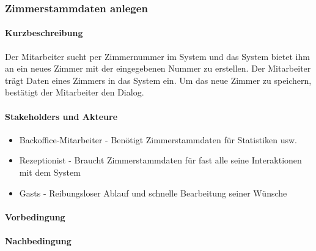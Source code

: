 \subsubsection{Zimmerstammdaten anlegen}

\paragraph{Kurzbeschreibung}
Der Mitarbeiter sucht per Zimmernummer im System und das System bietet ihm an ein neues Zimmer mit der eingegebenen Nummer zu erstellen. Der Mitarbeiter trägt Daten eines Zimmers in das System ein. Um das neue Zimmer zu speichern, bestätigt der Mitarbeiter den Dialog.

\paragraph{Stakeholders und Akteure}
\begin{itemize}
\item \Gls{Backoffice-Mitarbeiter} - Benötigt Zimmerstammdaten für Statistiken usw.
\item \Gls{Rezeptionist} - Braucht Zimmerstammdaten für fast alle seine Interaktionen mit dem System
\item \Glspl{Gast} - Reibungsloser Ablauf und schnelle Bearbeitung seiner Wünsche
\end{itemize}

\paragraph{Vorbedingung}


\paragraph{Nachbedingung}

